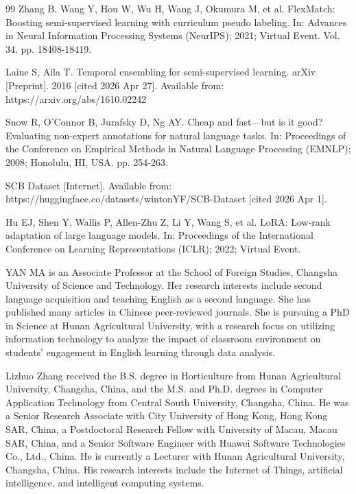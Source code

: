 \documentclass{ieeeaccess}
\begin{document}
\begin{thebibliography}{99}
Zhang B, Wang Y, Hou W, Wu H, Wang J, Okumura M, et al.
FlexMatch: Boosting semi-supervised learning with curriculum pseudo
labeling.
In: Advances in Neural Information Processing Systems (NeurIPS);
2021; Virtual Event. Vol. 34. pp. 18408-18419.

Laine S, Aila T.
Temporal ensembling for semi-supervised learning.
arXiv [Preprint]. 2016 [cited 2026 Apr 27]. Available from:
https://arxiv.org/abs/1610.02242

Snow R, O'Connor B, Jurafsky D, Ng AY.
Cheap and fast---but is it good? Evaluating non-expert annotations
for natural language tasks.
In: Proceedings of the Conference on Empirical Methods in Natural
Language Processing (EMNLP); 2008; Honolulu, HI, USA. pp. 254-263.

SCB Dataset [Internet]. Available from:
https://huggingface.co/datasets/wintonYF/SCB-Dataset [cited 2026 Apr 1].

Hu EJ, Shen Y, Wallis P, Allen-Zhu Z, Li Y, Wang S, et al.
LoRA: Low-rank adaptation of large language models.
In: Proceedings of the International Conference on Learning
Representations (ICLR); 2022; Virtual Event.

\end{thebibliography}
\EOD

\begin{IEEEbiographynophoto}{YAN MA}
is an Associate Professor at the School of Foreign Studies, Changsha
University of Science and Technology. Her research interests include
second language acquisition and teaching English as a second language.
She has published many articles in Chinese peer-reviewed journals. She
is pursuing a PhD in Science at Hunan Agricultural University, with a
research focus on utilizing information technology to analyze the
impact of classroom environment on students' engagement in English
learning through data analysis.
\end{IEEEbiographynophoto}

\begin{IEEEbiographynophoto}{Lizhuo Zhang}
received the B.S. degree in Horticulture from Hunan Agricultural
University, Changsha, China, and the M.S. and Ph.D. degrees in
Computer Application Technology from Central South University,
Changsha, China. He was a Senior Research Associate with City
University of Hong Kong, Hong Kong SAR, China, a Postdoctoral
Research Fellow with University of Macau, Macau SAR, China, and a
Senior Software Engineer with Huawei Software Technologies Co., Ltd.,
China. He is currently a Lecturer with Hunan Agricultural University,
Changsha, China. His research interests include the Internet of
Things, artificial intelligence, and intelligent computing systems.
\end{IEEEbiographynophoto}
\end{document}

